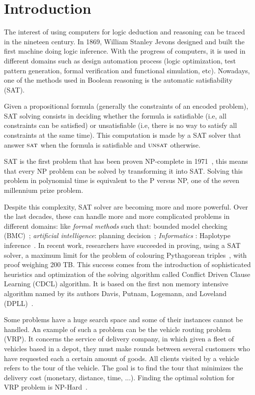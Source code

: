\chapter{Introduction}\label{chap:intro}


The interest of using computers for logic deduction and reasoning can be traced in the nineteen century.
In 1869,  William Stanley Jevons designed and built the first machine doing logic inference.
With the progress of computers, it is used in different domains such as design automation process 
(logic optimization, test pattern generation, formal verification and functional simulation, etc).
Nowadays, one of the methods used in Boolean reasoning is the automatic satisfiability (SAT).

Given a propositional formula (generally the constraints of an encoded problem),
SAT solving consists in deciding whether the formula is satisfiable (i.e, all constraints can be
satisfied) or unsatisfiable (i.e, there is no way to satisfy all constraints at the same time).
This computation is made by a SAT solver that answer $\textsc{sat}$ when the formula is satisfiable
and $\textsc{unsat}$ otherwise.

SAT is the first problem that has been proven NP-complete in 1971~\cite{cook1971complexity}, this 
means that every NP problem can be solved by transforming it into SAT. Solving this problem in 
polynomial time is equivalent to the P versus NP, one of the seven millennium prize problem.


Despite this complexity, SAT solver are becoming more and more powerful.
Over the last decades, these can handle more and more complicated problems in different domains:
like \emph{formal methods} such that: bounded model checking (BMC)~\cite{bmc_99}; \emph{artificial intelligence}: planning decision~\cite{planning_92}; \emph{Informatics} : Haplotype inference~\cite{biology_06}.
In recent work, researchers have succeeded in proving, using a SAT solver, a maximum limit
for the problem of colouring Pythagorean triples~\cite{heule2016solving}, with proof weighing 200 TB.
This success comes from the introduction of sophisticated heuristics and optimization of the solving 
algorithm called Conflict Driven Clause Learning (CDCL) algorithm. It is based on the first non memory
intensive algorithm named by its authors Davis, Putnam, Logemann, and Loveland (DPLL)~\cite{dpll_62}.



Some problems have a huge search space and some of their instances cannot be handled.
An example of such a problem can be the vehicle routing problem (VRP).
It concerns the service of delivery company, in which
given a fleet of vehicles based in a depot, they must make rounds between several customers  who have requested
each a certain amount of goods. All clients visited by a vehicle refers to the tour of the vehicle. 
The goal is to find the tour that minimizes the delivery cost (monetary, distance, time, ...).
Finding the optimal solution for VRP problem is NP-Hard~\cite{toth2002vehicle}.

